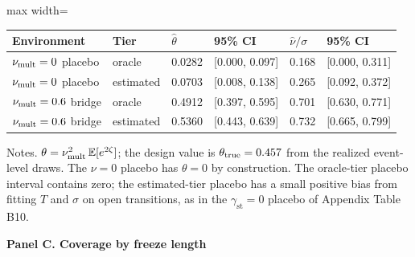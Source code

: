 \begin{table}[!htbp]
\begin{adjustbox}{max width=\linewidth}
\begin{tabular}{@{}llllll@{}}
\toprule
Environment & Tier & $\hat\theta$ & 95\% CI & $\hat\nu/\sigma$ & 95\% CI \\
\midrule
$\nu_{\rm mult}=0$ placebo & oracle & 0.0282 & [0.000, 0.097] & 0.168 & [0.000, 0.311] \\
$\nu_{\rm mult}=0$ placebo & estimated & 0.0703 & [0.008, 0.138] & 0.265 & [0.092, 0.372] \\
$\nu_{\rm mult}=0.6$ bridge & oracle & 0.4912 & [0.397, 0.595] & 0.701 & [0.630, 0.771] \\
$\nu_{\rm mult}=0.6$ bridge & estimated & 0.5360 & [0.443, 0.639] & 0.732 & [0.665, 0.799] \\
\bottomrule
\end{tabular}
\end{adjustbox}
\vspace{0.5em}
\par\noindent\begin{minipage}{\linewidth}\raggedright{\scriptsize Notes. $\theta=\nu_{\rm mult}^2\,\mathbb E[e^{2\zeta}]$; the design value is $\theta_{\rm true}=0.457$ from the realized event-level draws. The $\nu=0$ placebo has $\theta=0$ by construction. The oracle-tier placebo interval contains zero; the estimated-tier placebo has a small positive bias from fitting $T$ and $\sigma$ on open transitions, as in the $\gamma_{\mathrm{st}}=0$ placebo of Appendix Table B10.}\end{minipage}\par

\par\textbf{Panel C. Coverage by freeze length}


\end{table}

